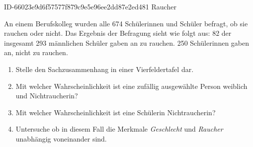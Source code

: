 \begin{exercise}
      {ID-66023e9d6f57577f879c9e5e96ee2dd87e2ed481}
      {Raucher}
  \ifproblem\problem\par
    An einem Berufskolleg wurden alle 674 Schülerinnen und Schüler befragt,
    ob sie rauchen oder nicht. Das Ergebnis der Befragung sieht wie folgt aus:
    82 der insgesamt 293 männlichen Schüler gaben an zu rauchen.
    250 Schülerinnen gaben an, nicht zu rauchen.
    \begin{enumerate}
      \item Stelle den Sachzusammenhang in einer Vierfeldertafel dar.
      \item Mit welcher Wahrscheinlichkeit ist eine zufällig ausgewählte
            Person weiblich und Nichtraucherin?
      \item Mit welcher Wahrscheinlichkeit ist eine Schülerin Nichtraucherin?
      \item Untersuche ob in diesem Fall die Merkmale \textit{Geschlecht}
            und \textit{Raucher} unabhängig voneinander sind.
    \end{enumerate}
  \fi
\end{exercise}
